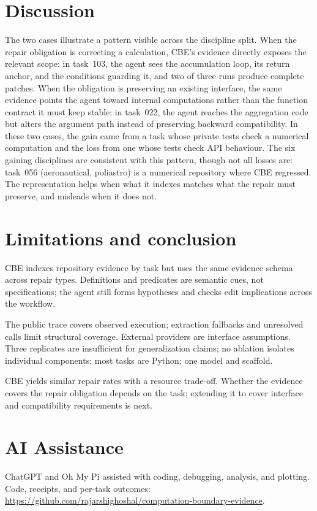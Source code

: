 \documentclass[11pt,a4paper,twocolumn]{article}
\begin{document}
\section{Discussion}
\label{sec:discussion}

The two cases illustrate a pattern visible across the discipline split. When the repair obligation is correcting a calculation, CBE's evidence directly exposes the relevant scope: in task~103, the agent sees the accumulation loop, its return anchor, and the conditions guarding it, and two of three runs produce complete patches. When the obligation is preserving an existing interface, the same evidence points the agent toward internal computations rather than the function contract it must keep stable: in task~022, the agent reaches the aggregation code but alters the argument path instead of preserving backward compatibility. In these two cases, the gain came from a task whose private tests check a numerical computation and the loss from one whose tests check API behaviour. The six gaining disciplines are consistent with this pattern, though not all losses are: task~056 (aeronautical, poliastro) is a numerical repository where CBE regressed. The representation helps when what it indexes matches what the repair must preserve, and misleads when it does not.

\section{Limitations and conclusion}
\label{sec:conclusion}
CBE indexes repository evidence by task but uses the same evidence schema across repair types. Definitions and predicates are semantic cues, not specifications; the agent still forms hypotheses and checks edit implications across the workflow.

The public trace covers observed execution; extraction fallbacks and unresolved calls limit structural coverage. External providers are interface assumptions. Three replicates are insufficient for generalization claims; no ablation isolates individual components; most tasks are Python; one model and scaffold.

CBE yields similar repair rates with a resource trade-off. Whether the evidence covers the repair obligation depends on the task; extending it to cover interface and compatibility requirements is next.

\section{AI Assistance}
ChatGPT and Oh My Pi assisted with coding, debugging, analysis, and plotting. Code, receipts, and per-task outcomes: \url{https://github.com/rajarshighoshal/computation-boundary-evidence}.


\end{document}
